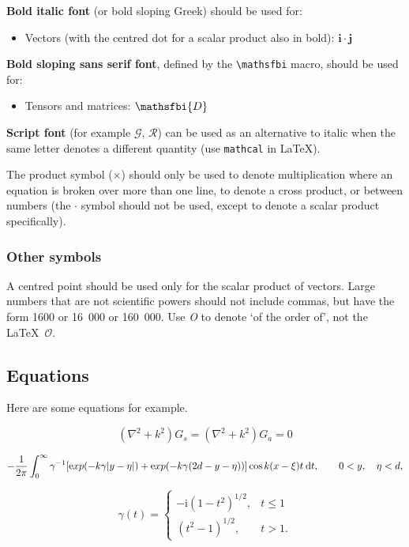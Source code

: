 \documentclass[12pt]{Style/RBM_P}
\begin{document}
\textbf{Bold italic font} (or bold sloping Greek) should be used for:

\begin{itemize}
\item  Vectors (with the centred dot for a scalar product also in bold): $\boldsymbol{i \cdot j}$
\end{itemize}

\textbf{Bold sloping sans serif font}, defined by the \verb|\mathsfbi| macro, should be used for:
\begin{itemize}
\item Tensors and matrices: $\mathsfbi{D}$
\end{itemize}

\textbf{Script font} (for example $\mathcal{G}$, $\mathcal{R}$) can be used as an alternative to italic when the same letter denotes a different quantity (use \verb|mathcal| in \LaTeX).

The product symbol ($\times$) should only be used to denote multiplication where an equation is broken over more than one line, to denote a cross product, or between numbers (the $\cdot$ symbol should not be used, except to denote a scalar product specifically).


\subsubsection{Other symbols}
A centred point should be used only for the scalar product of vectors.
Large numbers that are not scientific powers should not include commas, but have the
form 1600 or 16~000 or 160~000.
Use \textit{O} to denote `of the order of', not the \LaTeX\ $\mathcal{O}$.

\subsection{Equations}
Here are some equations for example.

\begin{equation}
  (\nabla^2+k^2)G_s=(\nabla^2+k^2)G_a=0
  \label{Helm}
\end{equation}

\begin{equation}
  -\frac{1}{2\pi} \int_0^{\infty} \gamma^{-1}[\mathrm exp(-k\gamma|y-\eta|)
   + \mathrm exp(-k\gamma(2d-y-\eta))] \cos k(x-\xi)t\:\mathrm{d} t,
   \qquad 0<y,\quad \eta<d,
\end{equation}

\begin{equation}
  \gamma(t) = \left\{
    \begin{array}{ll}
      -\mathrm{i}(1-t^2)^{1/2}, & t\le 1 \\[2pt]
      (t^2-1)^{1/2},         & t>1.
    \end{array} \right.
\end{equation}
\end{document}
